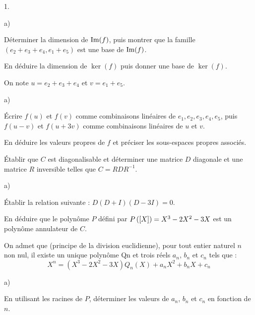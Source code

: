 \documentclass[11pt]{article}%
\begin{document}
\begin{noliste}{1.}
 \setlength{\itemsep}{4mm}
\item 
\begin{noliste}{a)}
 \setlength{\itemsep}{2mm}
\item Déterminer la dimension de $\operatorname{Im}(f)$, puis montrer que la famille
$(e_{2} + e_{3} + e_{4}, e_{1} + e_{5} )$ est une base de $\operatorname{Im}(f)$.
\item En déduire la dimension de $\ker(f)$ puis donner une base de
$\ker(f)$.
\end{noliste}

\item
On note $u = e_{2} + e_{3} + e_{4}$ et $v = e_{1} + e_{5}$.

\begin{noliste}{a)}
 \setlength{\itemsep}{2mm}
\item Écrire $f(u)$ et $f(v)$ comme combinaisons linéaires de
$e_{1},e_{2},e_{3},e_{4},e_{5}$, puis $f(u-v)$ et
$f (u + 3v)$ comme combinaisons linéaires de $u$ et $v$.

\item En déduire les valeurs propres de $f$ et préciser les
sous-espaces propres associés.

\item Établir que $C$ est diagonalisable et déterminer une matrice $D$
diagonale et une matrice $R$ inversible telles que $C = R D R^{-1}$.

\end{noliste}

\item
\begin{noliste}{a)}
 \setlength{\itemsep}{2mm}
\item Établir la relation suivante : $D(D + I)(D-3I) = 0$.

\item En déduire que le polynôme $P$ défini par $P\left(\left[ {X} \right]\right) =
X^{3} -2X^{2} -3X$ est un polynôme annulateur
de $C$.

\end{noliste}

\item On admet que (principe de la division euclidienne), pour tout
entier naturel $n$ non nul, il existe un unique polynôme Qn et trois
réels $a_{n}$, $b_{n}$ et $c_{n}$ tels que :
\[
 X^{n} = (X^{3} -2X^{2} -3X)Q_{n}(X) + a_{n} X^{2} + b_{n} X + c_{n}
\]

\begin{noliste}{a)}
 \setlength{\itemsep}{2mm}
\item En utilisant les racines de $P$, déterminer les valeurs de
$a_{n}$, $b_{n}$ et $c_{n}$ en fonction de $n$.


\end{noliste}
\end{noliste}
\end{document}
